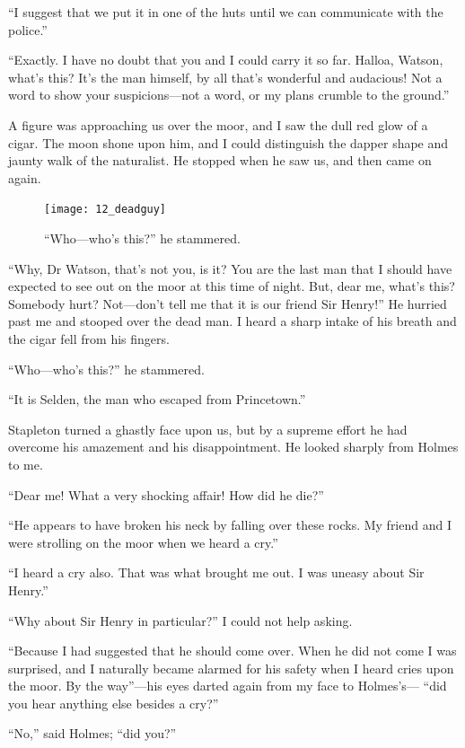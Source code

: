\documentclass[paper=5.5in:8.5in,BCOR=7mm,twoside,DIV=calc,12pt,usegeometry,openany,chapterprefix,endperiod,headings=big]{scrbook} %
\begin{document}
\enquote{I suggest that we put it in one of the huts until we can communicate with the police.}

\enquote{Exactly. I have no doubt that you and I could carry it so far. Halloa, Watson, what's this? It's the man himself, by all that's wonderful and audacious! Not a word to show your suspicions---not a word, or my plans crumble to the ground.}

A figure was approaching us over the moor, and I saw the dull red glow of a cigar. The moon shone upon him, and I could distinguish the dapper shape and jaunty walk of the naturalist. He stopped when he saw us, and then came on again.

\begin{figure}[tbph]
\centering
\texttt{[image: 12\_deadguy]}
\caption{\enquote{Who---who's this?} he stammered.}
\end{figure}

\enquote{Why, Dr Watson, that's not you, is it? You are the last man that I should have expected to see out on the moor at this time of night. But, dear me, what's this? Somebody hurt? Not---don't tell me that it is our friend Sir Henry!} He hurried past me and stooped over the dead man. I heard a sharp intake of his breath and the cigar fell from his fingers.

\enquote{Who---who's this?} he stammered.

\enquote{It is Selden, the man who escaped from Princetown.}

Stapleton turned a ghastly face upon us, but by a supreme effort he had overcome his amazement and his disappointment. He looked sharply from Holmes to me.

\enquote{Dear me! What a very shocking affair! How did he die?}

\enquote{He appears to have broken his neck by falling over these rocks. My friend and I were strolling on the moor when we heard a cry.}

\enquote{I heard a cry also. That was what brought me out. I was uneasy about Sir Henry.}

\enquote{Why about Sir Henry in particular?} I could not help asking.

\enquote{Because I had suggested that he should come over. When he did not come I was surprised, and I naturally became alarmed for his safety when I heard cries upon the moor. By the way}---his eyes darted again from my face to Holmes's--- \enquote{did you hear anything else besides a cry?}

\enquote{No,} said Holmes; \enquote{did you?}
\end{document}
